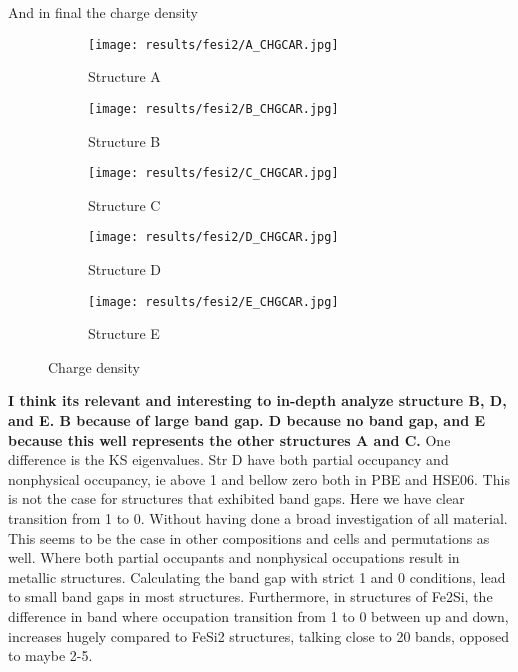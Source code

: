 And in final the charge density 

\begin{figure}
	\begin{subfigure}{0.5\textwidth}
		\texttt{[image: results/fesi2/A\_CHGCAR.jpg]}
		\caption{Structure A}
	\end{subfigure}
	\hfill
	\begin{subfigure}{0.5\textwidth}
		\texttt{[image: results/fesi2/B\_CHGCAR.jpg]}
		\caption{Structure B}
	\end{subfigure}
	\begin{subfigure}{0.5\textwidth}
		\texttt{[image: results/fesi2/C\_CHGCAR.jpg]}
		\caption{Structure C}
	\end{subfigure}
	\hfill
	\begin{subfigure}{0.5\textwidth}
		\texttt{[image: results/fesi2/D\_CHGCAR.jpg]}
		\caption{Structure D}
	\end{subfigure}
	\begin{subfigure}{0.5\textwidth}
		\texttt{[image: results/fesi2/E\_CHGCAR.jpg]}
		\caption{Structure E}
	\end{subfigure}
		\caption{Charge density}
		\label{chgcar}
\end{figure}


\textbf{I think its relevant and interesting to in-depth analyze structure B, D, and E. B because of large band gap. D because no band gap, and E because this well represents the other structures A and C. }
One difference is the KS eigenvalues. Str D have both partial occupancy and nonphysical occupancy, ie above 1 and bellow zero both in PBE and HSE06. This is not the case for structures that exhibited band gaps. Here we have clear transition from 1 to 0. Without having done a broad investigation of all material. This seems to be the case in other compositions and cells and permutations as well. Where both partial occupants and nonphysical occupations result in metallic structures. Calculating the band gap with strict 1 and 0 conditions, lead to small band gaps in most structures. Furthermore, in structures of Fe2Si, the difference in band where occupation transition from 1 to 0 between up and down, increases hugely compared to FeSi2 structures, talking close to 20 bands, opposed to maybe 2-5. 
